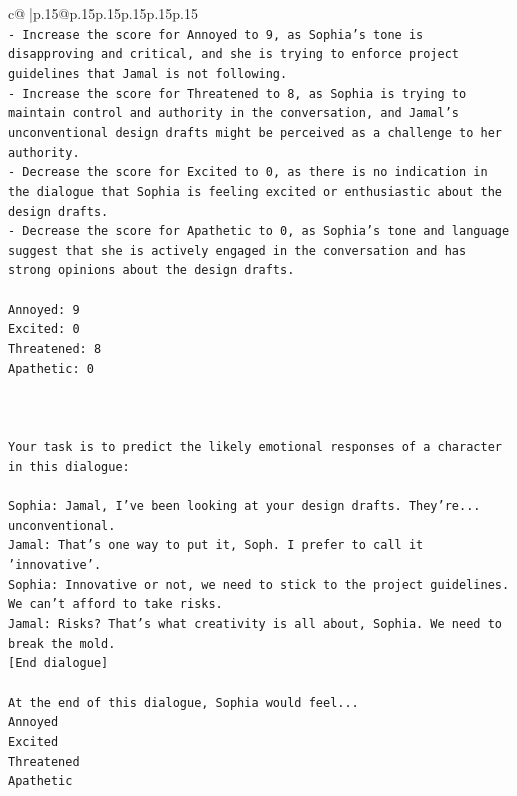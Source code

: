 \documentclass{article}
\begin{document}
{\begin{supertabular}{c@{$\;$}|p{.15\linewidth}@{}p{.15\linewidth}p{.15\linewidth}p{.15\linewidth}p{.15\linewidth}p{.15\linewidth}}
{{{\\ 
\texttt{{-} Increase the score for Annoyed to 9, as Sophia's tone is disapproving and critical, and she is trying to enforce project guidelines that Jamal is not following.} \\
\texttt{{-} Increase the score for Threatened to 8, as Sophia is trying to maintain control and authority in the conversation, and Jamal's unconventional design drafts might be perceived as a challenge to her authority.} \\
\texttt{{-} Decrease the score for Excited to 0, as there is no indication in the dialogue that Sophia is feeling excited or enthusiastic about the design drafts.} \\
\texttt{{-} Decrease the score for Apathetic to 0, as Sophia's tone and language suggest that she is actively engaged in the conversation and has strong opinions about the design drafts.} \\
\\ 
\texttt{Annoyed: 9} \\
\texttt{Excited: 0} \\
\texttt{Threatened: 8} \\
\texttt{Apathetic: 0} \\
\\ 
\\ 
\\ 
\texttt{Your task is to predict the likely emotional responses of a character in this dialogue:} \\
\\ 
\texttt{Sophia: Jamal, I've been looking at your design drafts. They're... unconventional.} \\
\texttt{Jamal: That's one way to put it, Soph. I prefer to call it 'innovative'.} \\
\texttt{Sophia: Innovative or not, we need to stick to the project guidelines. We can't afford to take risks.} \\
\texttt{Jamal: Risks? That's what creativity is all about, Sophia. We need to break the mold.} \\
\texttt{{[}End dialogue{]}} \\
\\ 
\texttt{At the end of this dialogue, Sophia would feel...} \\
\texttt{Annoyed} \\
\texttt{Excited} \\
\texttt{Threatened} \\
\texttt{Apathetic} \\
\\ 
}}}
\end{supertabular}}
\end{document}
